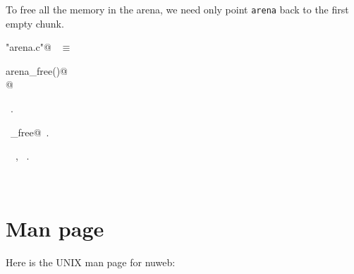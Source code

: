 \documentclass{report}
\begin{document}
To free all the memory in the arena, we need only point \verb|arena|
back to the first empty chunk.
\begin{flushleft} \small
\begin{minipage}{\linewidth} \label{scrap261}
\verb@"arena.c"@\nobreak\ {\footnotesize {} }$\equiv$
\vspace{-1ex}
\begin{list}{}{} \item
\mbox{}\verb@void arena_free()@\\
\mbox{}@\\
\mbox{}\verb@@{\NWsep}
\end{list}
\vspace{-1ex}
\footnotesize\addtolength{\baselineskip}{-1ex}
\begin{list}{}{\setlength{\itemsep}{-\parsep}\setlength{\itemindent}{-\leftmargin}}
\item \NWtxtFileDefBy\ .
\end{list}
\vspace{-2ex}
\footnotesize\addtolength{\baselineskip}{-1ex}
\begin{list}{}{\setlength{\itemsep}{-\parsep}\setlength{\itemindent}{-\leftmargin}}
\item \NWtxtIdentsDefed\nobreak\  \verb@arena_free@\nobreak\ .\end{list}
\vspace{-2ex}
\footnotesize\addtolength{\baselineskip}{-1ex}
\begin{list}{}{\setlength{\itemsep}{-\parsep}\setlength{\itemindent}{-\leftmargin}}
\item \NWtxtIdentsUsed\nobreak\  \verb@arena@\nobreak\ , \verb@first@\nobreak\ .\end{list}
\end{minipage}\\[4ex]
\end{flushleft}
\chapter{Man page}

Here is the UNIX man page for nuweb:
\end{document}
